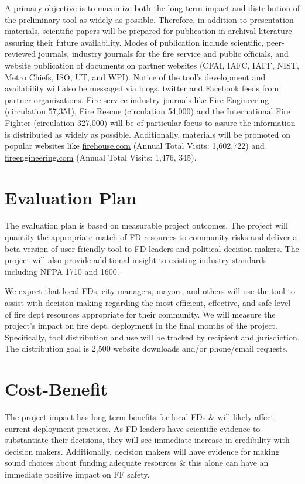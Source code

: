 \documentclass[12pt,letterpaper]{article}
\begin{document}
A primary objective is to maximize both the long-term impact and distribution of the preliminary tool as widely as possible. Therefore, in addition to presentation materials, scientific papers will be prepared for publication in archival literature assuring their future availability. Modes of publication include scientific, peer-reviewed journals, industry journals for the fire service and public officials, and website publication of documents on partner websites (CFAI, IAFC, IAFF, NIST, Metro Chiefs, ISO, UT, and WPI).  Notice of the tool's development and availability will also be messaged via blogs, twitter and Facebook feeds from partner organizations.  Fire service industry journals like Fire Engineering (circulation 57,351), Fire Rescue (circulation 54,000) and the International Fire Fighter (circulation 327,000) will be of particular focus to assure the information is distributed as widely as possible.  Additionally, materials will be promoted on popular websites like \href{www.firehouse.com}{firehouse.com} (Annual Total Visits: 1,602,722) and \href{http://www.fireengineering.com/index.html}{fireengineering.com} (Annual Total Visits: 1,476, 345). 



\section{Evaluation Plan}
\label{sec:eval}
The evaluation plan is based on measurable project outcomes. The project will quantify the appropriate match of FD resources to community risks and deliver a beta version of user friendly tool to FD leaders and political decision makers.  The project will also provide additional insight to existing industry standards including NFPA 1710 and 1600.  

We expect that local FDs, city managers, mayors, and others will use the tool to assist with decision making regarding the most efficient, effective, and safe level of fire dept resources appropriate for their community.  We will measure the project's impact on fire dept. deployment in the final months of the project.  Specifically, tool distribution and use will be tracked by recipient and jurisdiction.  The distribution goal is 2,500 website downloads and/or phone/email requests. 


\section{Cost-Benefit}
\label{sec:cost}
The project impact has long term benefits for local FDs \& will likely affect current deployment practices. As FD leaders have scientific evidence to substantiate their decisions, they will see immediate increase in credibility with decision makers.  Additionally, decision makers will have evidence for making sound choices about funding adequate resources \& this alone can have an immediate positive impact on FF safety.
\end{document}

